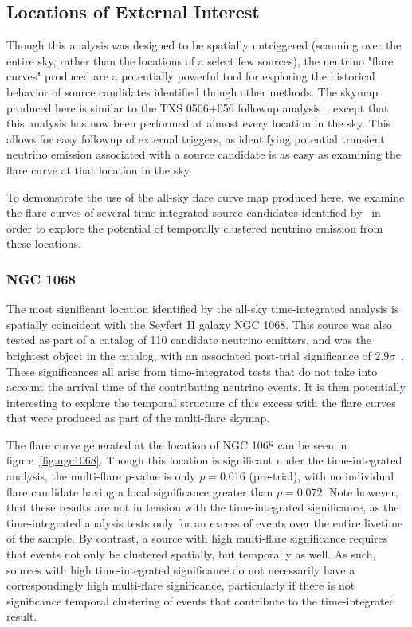 
\subsection{Locations of External Interest}
Though this analysis was designed to be spatially untriggered (scanning over the entire sky, rather than the locations of a select few sources), the neutrino "flare curves" produced are a potentially powerful tool for exploring the historical behavior of source candidates identified though other methods. The skymap produced here is similar to the TXS 0506+056 followup analysis~\cite{TXS_Archival}, except that this analysis has now been performed at almost every location in the sky. This allows for easy followup of external triggers, as identifying potential transient neutrino emission associated with a source candidate is as easy as examining the flare curve at that location in the sky. 

To demonstrate the use of the all-sky flare curve map produced here, we examine the flare curves of several time-integrated source candidates identified by~\cite{10yr_tint} in order to explore the potential of temporally clustered neutrino emission from these locations. 

\subsubsection{NGC 1068}

The most significant location identified by the all-sky time-integrated analysis is spatially coincident with the Seyfert II galaxy NGC 1068. This source was also tested as part of a catalog of 110 candidate neutrino emitters, and was the brightest object in the catalog, with an associated post-trial significance of $2.9 \sigma$~\cite{10yr_tint}. These significances all arise from time-integrated tests that do not take into account the arrival time of the contributing neutrino events. It is then potentially interesting to explore the temporal structure of this excess with the flare curves that were produced as part of the multi-flare skymap. 

The flare curve generated at the location of NGC 1068 can be seen in figure~\ref{fig:ngc1068}. Though this location is significant under the time-integrated analysis, the multi-flare p-value is only $p=0.016$ (pre-trial), with no individual flare candidate having a local significance greater than $p=0.072$. Note however, that these results are not in tension with the time-integrated significance, as the time-integrated analysis tests only for an excess of events over the entire livetime of the sample. By contrast, a source with high multi-flare significance requires that events not only be clustered spatially, but temporally as well. As such, sources with high time-integrated significance do not necessarily have a correspondingly high multi-flare significance, particularly if there is not significance temporal clustering of events that contribute to the time-integrated result. 

